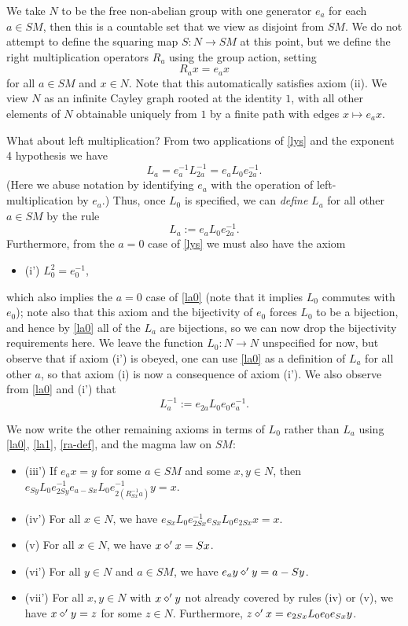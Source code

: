 We take $N$ to be the free non-abelian group with one generator $e_a$ for each $a \in SM$, then this is a countable set that we view as disjoint from $SM$.  We do not attempt to define the squaring map $S: N \to SM$ at this point, but we define the right multiplication operators $R_a$ using the group action, setting
\begin{equation}\label{ra-def}
  R_a x = e_a x
\end{equation}
for all $a \in SM$ and $x \in N$.  Note that this automatically satisfies axiom (ii).  We view $N$ as an infinite Cayley graph rooted at the identity $1$, with all other elements of $N$ obtainable uniquely from $1$ by a finite path with edges $x \mapsto e_a x$.

What about left multiplication?  From two applications of \eqref{lys} and the exponent 4 hypothesis we have
$$ L_a = e_a^{-1} L_{2a}^{-1} = e_a L_0 e_{2a}^{-1}.$$
(Here we abuse notation by identifying $e_a$ with the operation of left-multiplication by $e_a$.) Thus, once $L_0$ is specified, we can \emph{define} $L_a$ for all other $a \in SM$ by the rule
\begin{equation}\label{la0}
  L_a := e_a L_0 e_{2a}^{-1}.
\end{equation}
Furthermore, from the $a=0$ case of \eqref{lys} we must also have the axiom
\begin{itemize}
  \item (i') $L_0^2 = e_0^{-1}$,
\end{itemize}
which also implies the $a=0$ case of \eqref{la0} (note that it implies $L_0$ commutes with $e_0$); note also that this axiom and the bijectivity of $e_0$ forces $L_0$ to be a bijection, and hence by \eqref{la0} all of the $L_a$ are bijections, so we can now drop the bijectivity requirements here.  We leave the function $L_0: N \to N$ unspecified for now, but observe that if axiom (i') is obeyed, one can use \eqref{la0} as a definition of $L_a$ for all other $a$, so that axiom (i) is now a consequence of axiom (i').  We also observe from \eqref{la0} and (i') that
\begin{equation}\label{la1}
  L_a^{-1} := e_{2a} L_0 e_0 e_{a}^{-1}.
\end{equation}

We now write the other remaining axioms in terms of $L_0$ rather than $L_a$ using \eqref{la0}, \eqref{la1}, \eqref{ra-def}, and the magma law on $SM$:
\begin{itemize}
\item (iii')  If $e_a x = y$ for some $a \in SM$ and some $x,y \in N$, then $e_{Sy} L_0 e_{2Sy}^{-1} e_{a - Sx} L_0 e_{2(R_{Sx}^{-1} a)}^{-1} y = x$.
\item (iv')  For all $x \in N$, we have $e_{Sx} L_0 e_{2Sx}^{-1} e_{Sx} L_0 e_{2Sx} x = x$.
\item (v)  For all $x \in N$, we have $x \diamond' x = Sx$.
\item (vi')  For all $y \in N$ and $a \in SM$, we have $e_a y \diamond' y = a - Sy$.
\item (vii')  For all $x,y \in N$ with $x \diamond' y$ not already covered by rules (iv) or (v), we have $x \diamond' y = z$ for some $z \in N$.  Furthermore, $z \diamond' x = e_{2Sx} L_0 e_0 e_{Sx} y$.
\end{itemize}

